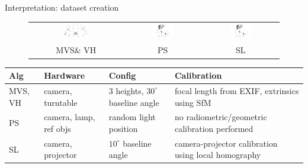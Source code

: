 \documentclass[10pt]{beamer}
\begin{document}
\begin{frame}{Interpretation: dataset creation}

\begin{figure}
\centering
\begin{tabular}{ccc}
\includegraphics[width=0.3\textwidth]{images/mvs_calib.PNG} &
\includegraphics[width=0.3\textwidth]{images/sl_calib.png} &
\includegraphics[width=0.3\textwidth]{images/sl_calib.png}\\
MVS\& VH & PS & SL \\
\end{tabular}
\end{figure}

\begin{table}
  \begin{tabular}{p{1cm}p{2cm}p{2.5cm}p{4cm}}
  Alg & Hardware & Config & Calibration \\
  \midrule
  MVS, VH & camera, turntable  & 3 heights, $30^\circ$ baseline angle & focal length from EXIF, extrinsics using SfM \\
  PS & camera, lamp, ref objs & random light position & no radiometric/geometric calibration performed \\
  SL & camera, projector & $10^\circ$ baseline angle & camera-projector calibration using local homography\\
  \end{tabular}
\end{table}

\end{frame}
\end{document}
